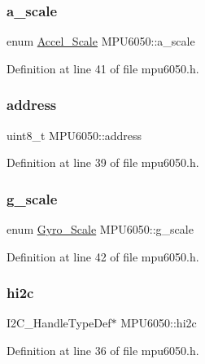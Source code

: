 \subsubsection{\texorpdfstring{a\_scale}{a\_scale}}
{\footnotesize\ttfamily enum \mbox{\hyperlink{mpu6050_8h_ab2aa80c677de9888d409d544ddb4e7a6}{Accel\+\_\+\+Scale}} M\+P\+U6050\+::a\+\_\+scale}



Definition at line 41 of file mpu6050.\+h.

\mbox{\label{struct_m_p_u6050_a76ed3c7dd3e6980e8958c82ed4ebcaeb}} 
\subsubsection{\texorpdfstring{address}{address}}
{\footnotesize\ttfamily uint8\+\_\+t M\+P\+U6050\+::address}



Definition at line 39 of file mpu6050.\+h.

\mbox{\label{struct_m_p_u6050_a761521053ae5eeaaa06a96b0c15543bc}} 
\subsubsection{\texorpdfstring{g\_scale}{g\_scale}}
{\footnotesize\ttfamily enum \mbox{\hyperlink{mpu6050_8h_aafecca78685b4c6a67c94fcce77151d2}{Gyro\+\_\+\+Scale}} M\+P\+U6050\+::g\+\_\+scale}



Definition at line 42 of file mpu6050.\+h.

\mbox{\label{struct_m_p_u6050_aa133576cdb5e081dfe9b0d1c3d168b31}} 
\subsubsection{\texorpdfstring{hi2c}{hi2c}}
{\footnotesize\ttfamily I2\+C\+\_\+\+Handle\+Type\+Def$\ast$ M\+P\+U6050\+::hi2c}



Definition at line 36 of file mpu6050.\+h.

\mbox{\label{struct_m_p_u6050_a1448ddadf65cd8e48d3873e1fcb00b8b}} 
